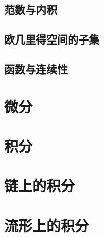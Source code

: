 \section{范数与内积}\label{section0090101}


\section{欧几里得空间的子集}\label{section0090102}



\section{函数与连续性}\label{section0090103}



\chapter{微分}\label{chapter00902}



\chapter{积分}\label{chapter00903}




\chapter{链上的积分}\label{chapter00904}




\chapter{流形上的积分}\label{chapter00905}

